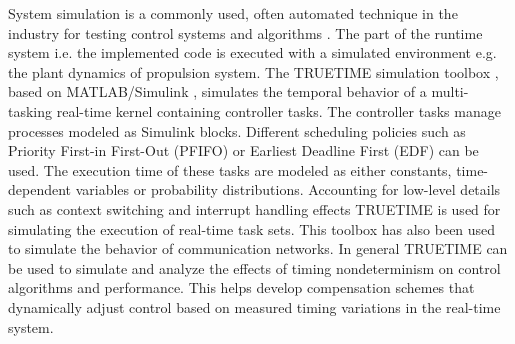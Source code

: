 System simulation is a commonly used, often automated technique in the industry for testing control systems and algorithms \cite{henriksson2003truetime, kim1994simulation}. The part of the runtime system i.e. the implemented code is executed with a simulated environment e.g. the plant dynamics of propulsion system. The TRUETIME simulation toolbox \cite{henriksson2002truetime}, based on MATLAB/Simulink \cite{simulink1993mathworks}, simulates the temporal behavior of a multi-tasking real-time kernel containing controller tasks. The controller tasks manage processes modeled as Simulink blocks. Different scheduling policies such as Priority First-in First-Out (PFIFO) or Earliest Deadline First (EDF) can be used. The execution time of these tasks are modeled as either constants, time-dependent variables or probability distributions. Accounting for low-level details such as context switching and interrupt handling effects TRUETIME is used for simulating the execution of real-time task sets. This toolbox has also been used to simulate the behavior of communication networks. In general TRUETIME can be used to simulate and analyze the effects of timing nondeterminism on control algorithms and performance. This helps develop compensation schemes that dynamically adjust control based on measured timing variations in the real-time system. 

